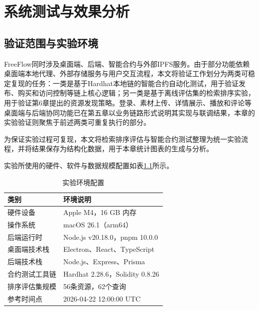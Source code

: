 
\chapter{系统测试与效果分析}


\section{验证范围与实验环境}

FreeFlow同时涉及桌面端、后端、智能合约与外部IPFS服务。由于部分功能依赖桌面端本地代理、外部存储服务与用户交互流程，本文将验证工作划分为两类可稳定复现的任务：一类是基于Hardhat本地链的智能合约自动化测试，用于验证发布、购买和访问控制等链上核心逻辑；另一类是基于离线评估集的检索排序实验，用于验证第6章提出的资源发现策略。登录、素材上传、详情展示、播放和评论等桌面端与后端协同功能已在第五章以业务链路形式说明其实现与联调结果，本章的实验验证则聚焦于前述两类可重复执行的部分。

为保证实验过程可复现，本文将检索排序评估与智能合约测试整理为统一实验流程，并将结果保存为结构化数据，用于本章统计图表的生成与分析。

实验所使用的硬件、软件与数据规模配置如表\ref{tab:test_environment}所示。

\begin{table}[htbp]
    \linespread{1.5}
    \songti
    \centering
    \caption{实验环境配置}\label{tab:test_environment}
    \begin{tabular}{|l|p{10cm}|}
        \hline
        类别      & 环境说明                           \\ \hline
        硬件设备    & Apple M4，16 GB 内存              \\ \hline
        操作系统    & macOS 26.1（arm64）              \\ \hline
        后端运行时   & Node.js v20.18.0，pnpm 10.0.0   \\ \hline
        桌面端技术栈  & Electron、React、TypeScript      \\ \hline
        后端技术栈   & Node.js、Express、Prisma         \\ \hline
        合约测试工具链 & Hardhat 2.28.6，Solidity 0.8.26 \\ \hline
        排序评估集规模 & 56条资源，62个查询                    \\ \hline
        参考时间点   & 2026-04-22 12:00:00 UTC        \\ \hline
    \end{tabular}
\end{table}


